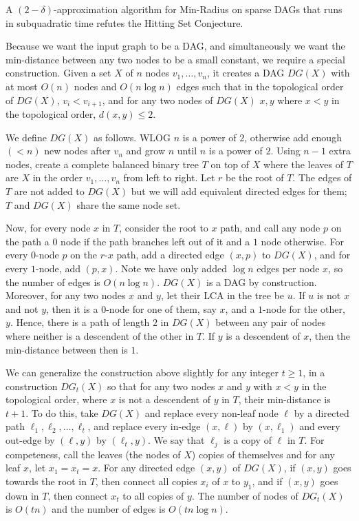 \begin{lemma}
\label{lem:MinRad}
A $(2-\delta)$-approximation algorithm for Min-Radius on sparse DAGs that runs in subquadratic time refutes the Hitting Set Conjecture.
\end{lemma}


Because we want the input graph to be a DAG, and simultaneously we want the min-distance between any two nodes to be a small constant, we require a special construction.
Given a set $X$ of $n$ nodes $v_1,\ldots,v_n$, it creates a DAG $DG(X)$ with at most $O(n)$ nodes and $O(n\log n)$ edges such that in the topological order of $DG(X)$, $v_i<v_{i+1}$, and for any two nodes of $DG(X)$ $x,y$ where $x<y$ in the topological order, $d(x,y)\leq 2$.

We define $DG(X)$ as follows. WLOG $n$ is a power of $2$, otherwise add enough $(<n)$ new nodes after $v_n$ and grow $n$ until $n$ is a power of $2$.
Using $n-1$ extra nodes, create a complete balanced binary tree $T$ on top of $X$ where the leaves of $T$ are $X$ in the order $v_1,\ldots, v_n$ from left to right. 
Let $r$ be the root of $T$. The edges of $T$ are not added to $DG(X)$ but we will add equivalent directed edges for them; $T$ and $DG(X)$ share the same node set. 

Now, for every node $x$ in $T$, consider the root to $x$ path, and call any node $p$ on the path a $0$ node if the path branches left out of it and a $1$ node otherwise. For every $0$-node $p$ on the $r$-$x$ path, add a directed edge $(x,p)$ to $DG(X)$, and for every $1$-node, add $(p,x)$. Note we have only added $\log n$ edges per node $x$, so the number of edges is $O(n\log n)$. $DG(X)$ is a DAG by construction. Moreover, for any two nodes $x$ and $y$, let their LCA in the tree be $u$. If $u$ is not $x$ and not $y$, then it is a $0$-node for one of them, say $x$, and a $1$-node for the other, $y$. 
Hence, there is a path of length $2$ in $DG(X)$ between any pair of nodes where neither is a descendent of the other in $T$. If $y$ is a descendent of $x$, then the min-distance between then is $1$.

We can generalize the construction above slightly for any integer $t\geq 1$, in a construction $DG_t(X)$ so that for any two nodes $x$ and $y$ with $x<y$ in the topological 
order, where $x$ is not a descendent of $y$ in $T$, their min-distance is $t+1$. To do this, take $DG(X)$ and replace every non-leaf node $\ell$ by a directed path $\ell_1,\ell_2,\ldots,\ell_t$, and replace every in-edge $(x,\ell)$ by $(x,\ell_1)$ and every out-edge by $(\ell,y)$ by $(\ell_t,y)$. We say that $\ell_j$ is a copy of $\ell$ in $T$.
For competeness, call the leaves (the nodes of $X$) copies of themselves and for any leaf $x$, let $x_1=x_t=x$.
For any directed edge $(x,y)$ of $DG(X)$, if $(x,y)$ goes towards the root in $T$, then connect all copies $x_i$ of $x$ to $y_1$, and if $(x,y)$ goes down in $T$, then connect $x_t$ to all copies of $y$. The number of nodes of $DG_t(X)$ is $O(tn)$ and the number of edges is $O(tn\log n)$.



